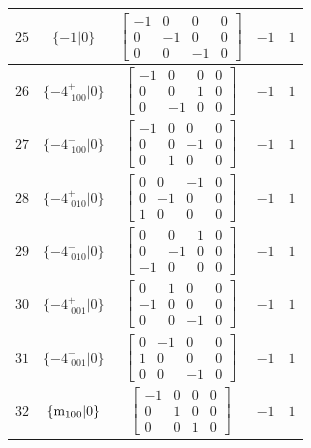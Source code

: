\documentclass[fleqn,8pt]{jsarticle}
\begin{document}
\begin{longtable}{ccccc}
$ 25 $ & $ \{-1|0\} $ & $ \begin{bmatrix} -1 & 0 & 0 & 0 \\ 0 & -1 & 0 & 0 \\ 0 & 0 & -1 & 0 \end{bmatrix} $ & $ -1 $ & $ 1 $ \\ \hline
$ 26 $ & $ \{-4^{+}_{\,\,100}|0\} $ & $ \begin{bmatrix} -1 & 0 & 0 & 0 \\ 0 & 0 & 1 & 0 \\ 0 & -1 & 0 & 0 \end{bmatrix} $ & $ -1 $ & $ 1 $ \\ \hline
$ 27 $ & $ \{-4^{-}_{\,\,100}|0\} $ & $ \begin{bmatrix} -1 & 0 & 0 & 0 \\ 0 & 0 & -1 & 0 \\ 0 & 1 & 0 & 0 \end{bmatrix} $ & $ -1 $ & $ 1 $ \\ \hline
$ 28 $ & $ \{-4^{+}_{\,\,010}|0\} $ & $ \begin{bmatrix} 0 & 0 & -1 & 0 \\ 0 & -1 & 0 & 0 \\ 1 & 0 & 0 & 0 \end{bmatrix} $ & $ -1 $ & $ 1 $ \\ \hline
$ 29 $ & $ \{-4^{-}_{\,\,010}|0\} $ & $ \begin{bmatrix} 0 & 0 & 1 & 0 \\ 0 & -1 & 0 & 0 \\ -1 & 0 & 0 & 0 \end{bmatrix} $ & $ -1 $ & $ 1 $ \\ \hline
$ 30 $ & $ \{-4^{+}_{\,\,001}|0\} $ & $ \begin{bmatrix} 0 & 1 & 0 & 0 \\ -1 & 0 & 0 & 0 \\ 0 & 0 & -1 & 0 \end{bmatrix} $ & $ -1 $ & $ 1 $ \\ \hline
$ 31 $ & $ \{-4^{-}_{\,\,001}|0\} $ & $ \begin{bmatrix} 0 & -1 & 0 & 0 \\ 1 & 0 & 0 & 0 \\ 0 & 0 & -1 & 0 \end{bmatrix} $ & $ -1 $ & $ 1 $ \\ \hline
$ 32 $ & $ \{{\rm m}_{100}|0\} $ & $ \begin{bmatrix} -1 & 0 & 0 & 0 \\ 0 & 1 & 0 & 0 \\ 0 & 0 & 1 & 0 \end{bmatrix} $ & $ -1 $ & $ 1 $ \\ \hline

\end{longtable}
\end{document}
